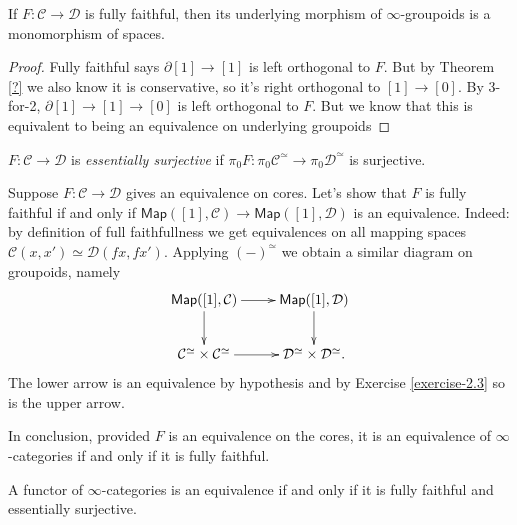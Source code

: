 \begin{lemma}
\label{lemma-full-faithful-implies-underlying-groupoid-map-is-monomorphism}
If $F: \mathcal{C} \to \mathcal{D}$ is fully faithful,
then its underlying morphism of $\infty$-groupoids is a monomorphism
of spaces.
\end{lemma}

\begin{proof}
Fully faithful says $\partial[1] \to [1]$ is 
left orthogonal to $F$. But by Theorem \ref{?}
we also know it is conservative, so it's right orthogonal
to $[1] \to [0]$. By 3-for-2, $\partial[1] \to [1] \to [0]$ 
is left orthogonal to $F$. But we know that this is equivalent
to being an equivalence on underlying groupoids
\end{proof}

\begin{definition}
\label{definition-essentially-surjective}
$F:\mathcal{C} \to \mathcal{D}$ is {\it essentially surjective} if
$\pi_0F: \pi_0\mathcal{C}^\simeq \to \pi_0\mathcal{D}^\simeq$ is surjective.
\end{definition}

\begin{remark}
\label{remark-equivalence-on-cores-implies-fully-faithful-equivalence}
Suppose $F:\mathcal{C} \to \mathcal{D}$ gives an equivalence
on cores. Let's show that $F$ is fully faithful
if and only if $\mathsf{Map}([1],\mathcal{C}) \to \mathsf{Map}([1],\mathcal{D})$ 
is an equivalence. Indeed: by definition of full faithfullness
we get equivalences on all mapping spaces 
$\mathcal{C}(x,x') \simeq \mathcal{D}(fx,fx')$.
Applying $(-)^\simeq$ we obtain a similar diagram on groupoids,
namely
$$
\xymatrix{
\mathsf{Map}([1],\mathcal{C})\ar[r]\ar[d]&
\mathsf{Map}([1],\mathcal{D})\ar[d]\\
\mathcal{C}^\simeq \times \mathcal{C}^\simeq\ar[r]&
\mathcal{D}^\simeq\times \mathcal{D}^\simeq.
}
$$
The lower arrow is an equivalence by hypothesis
and by Exercise \ref{exercise-2.3} so is the upper arrow.

In conclusion, provided $F$ is an equivalence on the cores,
it is an equivalence of $\infty$-categories if and only if it
is fully faithful. 
\end{remark}

\begin{lemma}
\label{lemma-equivalence-iff-fully-faithful-and-essentially-surjective}
A functor of $\infty$-categories is an equivalence
if and only if it is fully faithful and essentially surjective.
\end{lemma}

